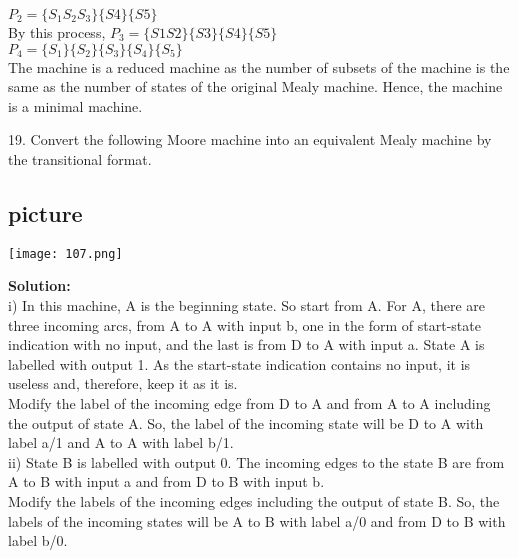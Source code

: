 \documentclass{article}
\begin{document}
\hspace*{4cm} $P_2 = \{S_1S_2S_3\}\{S4\}\{S5\}$ \\

\hspace*{0.5cm} By this process, $P_3 = \{S1S2\}\{S3\}\{S4\}\{S5\}$ \\

\hspace*{4cm} $P_4 = \{S_1\}\{S_2\}\{S_3\}\{S_4\}\{S_5\}$ \\

\hspace*{0.5cm} The machine is a reduced machine as the number of subsets of the machine is the same
as the number of states of the original Mealy machine. Hence, the machine is a minimal
machine.\\

\vspace*{0.4cm}

19. Convert the following Moore machine into an equivalent Mealy machine by the transitional
format.\\

\vspace*{0.1cm}
\begin{center}
\section{picture}
\texttt{[image: 107.png]}
\end{center}

\textbf{Solution:}\\
i) In this machine, A is the beginning state. So start from A. For A, there are three incoming
arcs, from A to A with input b, one in the form of start-state indication with no input, and the
last is from D to A with input a. State A is labelled with output 1. As the start-state indication
contains no input, it is useless and, therefore, keep it as it is.\\

\hspace*{0.5cm} Modify the label of the incoming edge from D to A and from A to A including the output
of state A. So, the label of the incoming state will be D to A with label a/1 and A to A with
label b/1.\\

\vspace*{0.2cm}
ii) State B is labelled with output 0. The incoming edges to the state B are from A to B with input
a and from D to B with input b.\\
\hspace*{0.5cm} Modify the labels of the incoming edges including the output of state B. So, the labels of
the incoming states will be A to B with label a/0 and from D to B with label b/0.\\
\end{document}
